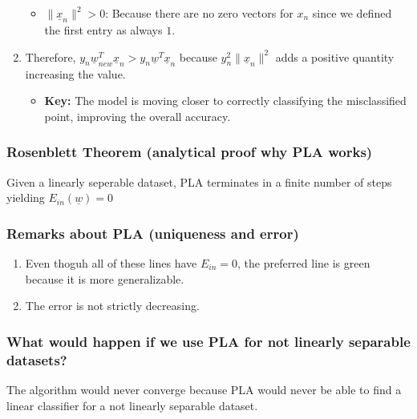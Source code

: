 \begin{intuition}
\begin{enumerate}
\begin{itemize}
                \item $\lVert \underline{x}_n \rVert^2 > 0$: Because there are no zero vectors for $x_n$ since we defined the first entry as always $1$. 
            \end{itemize}
            \item Therefore, $ y_n \underline{w}_{new}^T \underline{x}_n > y_n \underline{w}^T \underline{x}_n$ because $y_n^2 \lVert \underline{x}_n \rVert^2$ adds a positive quantity increasing the value. 
            \begin{itemize}
                \item \textbf{Key:} The model is moving closer to correctly classifying the misclassified point, improving the overall accuracy.
            \end{itemize}
        \end{enumerate}
    \end{intuition}

    \subsubsection{Rosenblett Theorem (analytical proof why PLA works)}
    \begin{theorem}
        Given a linearly seperable dataset, PLA terminates in a finite number of steps yielding $E_{in} (\underline{w}) = 0$
    \end{theorem}

    \subsubsection{Remarks about PLA (uniqueness and error)}
    \begin{intuition}
        \begin{enumerate}
            \item Even thoguh all of these lines have $E_{in} = 0$, the preferred line is green because it is more generalizable.
            \item The error is not strictly decreasing.
        \end{enumerate}
    \end{intuition}

    \subsubsection{What would happen if we use PLA for not linearly separable datasets?}
    \begin{intuition}
        The algorithm would never converge because PLA would never be able to find a linear classifier for a not linearly separable dataset.
    \end{intuition}

